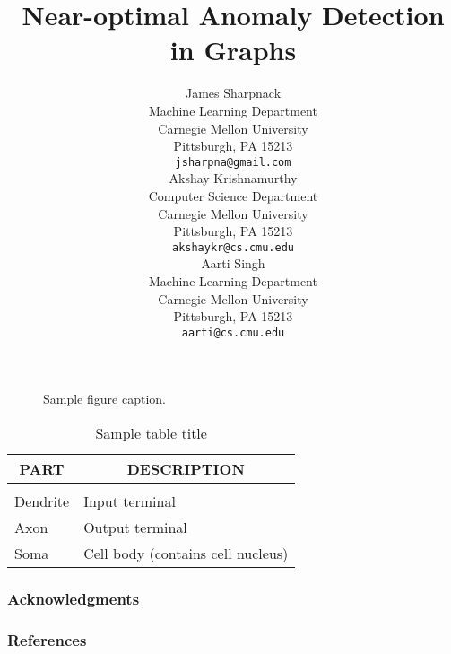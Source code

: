\documentclass{article} %
\title{Near-optimal Anomaly Detection in Graphs}
\author{
James Sharpnack \\
Machine Learning Department\\
Carnegie Mellon University\\
Pittsburgh, PA 15213 \\
\texttt{jsharpna@gmail.com} \\
\And
Akshay Krishnamurthy\\
Computer Science Department\\
Carnegie Mellon University\\
Pittsburgh, PA 15213 \\
\texttt{akshaykr@cs.cmu.edu} \\
\AND
Aarti Singh \\
Machine Learning Department\\
Carnegie Mellon University\\
Pittsburgh, PA 15213 \\
\texttt{aarti@cs.cmu.edu} \\
}
\begin{document}
\maketitle






\begin{figure}[h]
\begin{center}
\fbox{\rule[-.5cm]{0cm}{4cm} \rule[-.5cm]{4cm}{0cm}}
\end{center}
\caption{Sample figure caption.}
\end{figure}

\begin{table}[t]
\caption{Sample table title}
\label{sample-table}
\begin{center}
\begin{tabular}{ll}
\multicolumn{1}{c}{\bf PART}  &\multicolumn{1}{c}{\bf DESCRIPTION}
\\ \hline \\
Dendrite         &Input terminal \\
Axon             &Output terminal \\
Soma             &Cell body (contains cell nucleus) \\
\end{tabular}
\end{center}
\end{table}


\subsubsection*{Acknowledgments}


\subsubsection*{References}



\end{document}
